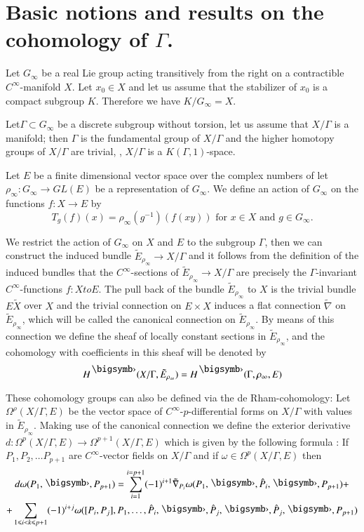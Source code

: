 \section{Basic notions and results on the cohomology of $\Gamma$.}\label{art5-sec1}

Let $G_\infty$ be a real Lie group acting transitively from the right on a contractible $C^\infty$-manifold $X$. Let $x_0 \in X$ and let us assume that the stabilizer of $x_0$ is a compact subgroup $K$. Therefore we have $K / G_\infty = X$. 

Let\pageoriginale $\Gamma \subset G_\infty$ be a discrete subgroup without torsion, let us assume that $X/\Gamma$ is a manifold; then $\Gamma$ is the fundamental group of $X/ \Gamma$ and the higher homotopy groups of $X / \Gamma$ are trivial, \ie, $X/ \Gamma$ is a $K (\Gamma , 1)$-space.

Let $E$ be a finite dimensional vector space over the complex numbers of let $\rho_\infty: G_\infty \to G L (E)$ be a representation of $G_\infty$. We define an action of $G_\infty$ on the functions $f : X \to E$ by
$$
T_g (f) (x) = \rho_\infty (g^{-1}) (f (xy)) \text{ for } x \in X \text{ and } g \in G_\infty.
$$

We restrict the action of $G_\infty$ on $X$ and $E$ to the subgroup $\Gamma$, then we can construct the induced bundle $\tilde{E}_{\rho_\infty} \to X / \Gamma$ and it follows from the definition of the induced bundles that the $C^\infty$-sections of $\tilde{E}_{\rho_\infty} \to X / \Gamma$ are precisely the $\Gamma$-invariant $C^\infty$-functions $f: X to E$. The pull back of the bundle $\tilde{E}_{\rho_\infty}$ to $X$ is the trivial bundle $E \tilde X$ over $X$ and the trivial connection on $E \times X$ induces a flat connection $\tilde{\nabla}$ on $\tilde{E}_{\rho_\infty}$, which will be called the canonical connection on $\tilde{E}_{\rho_\infty}$. By means of this connection we define the sheaf of locally constant sections in $\tilde{E}_{\rho_\infty}$, and the cohomology with coefficients in this sheaf will be denoted by
$$
H^\bigdot (X/ \Gamma, \tilde{E}_{\rho_\infty}) = H^\bigdot (\Gamma, \rho_\infty, E)
$$

These cohomology groups can also be defined via the de Rham-cohomology: Let $\Omega^\rho (X/ \Gamma , E)$ be the vector space of $C^\infty$-$p$-differential forms on $X/\Gamma$ with values in $\tilde{E}_{\rho_\infty}$. Making use of the canonical connection we define the exterior derivative $d: \Omega^p (X/ \Gamma, E) \to \Omega^{p+1} (X/ \Gamma, E)$ which is given by the following formula : If $P_1, P_2,\ldots P_{p+1}$ are $C^\infty$-vector fields on $X/ \Gamma$ and if $\omega \in \Omega^p (X / \Gamma, E)$ then 
\begin{multline}
d\omega (P_1 ,\bigdot, P_{p+1}) = \sum\limits^{i = p+1}_{i=1} (-1)^{i+1} \tilde{\nabla}_{P_i} \omega (P_1, \bigdot, \hat{P}_i, \bigdot, P_{p+1}) + \\
+ \sum\limits_{1 \leqslant i < k \leqslant p+1} (-1)^{i+j} \omega ([P_i, P_j], P_1, \ldots, \hat{P}_i, \bigdot, \hat{P}_j, \bigdot, \hat{P}_j, \bigdot, P_{p+1}) \label{art5-eq1.1}
\end{multline}


